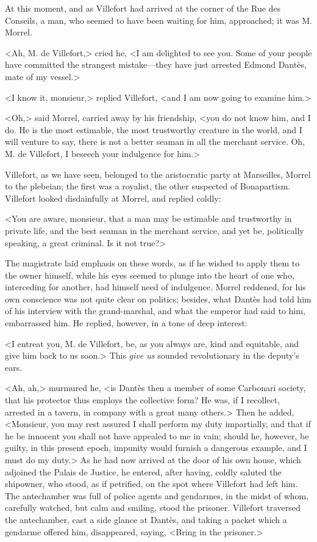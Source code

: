  At this moment, and as Villefort had arrived at the corner of the Rue des Conseils, a man, who seemed to have been waiting for him, approached; it was M. Morrel. 

 <Ah, M. de Villefort,> cried he, <I am delighted to see you. Some of your people have committed the strangest mistake—they have just arrested Edmond Dantès, mate of my vessel.> 

 <I know it, monsieur,> replied Villefort, <and I am now going to examine him.> 

 <Oh,> said Morrel, carried away by his friendship, <you do not know him, and I do. He is the most estimable, the most trustworthy creature in the world, and I will venture to say, there is not a better seaman in all the merchant service. Oh, M. de Villefort, I beseech your indulgence for him.> 

 Villefort, as we have seen, belonged to the aristocratic party at Marseilles, Morrel to the plebeian; the first was a royalist, the other suspected of Bonapartism. Villefort looked disdainfully at Morrel, and replied coldly: 

 <You are aware, monsieur, that a man may be estimable and trustworthy in private life, and the best seaman in the merchant service, and yet be, politically speaking, a great criminal. Is it not true?> 

 The magistrate laid emphasis on these words, as if he wished to apply them to the owner himself, while his eyes seemed to plunge into the heart of one who, interceding for another, had himself need of indulgence. Morrel reddened, for his own conscience was not quite clear on politics; besides, what Dantès had told him of his interview with the grand-marshal, and what the emperor had said to him, embarrassed him. He replied, however, in a tone of deep interest: 

 <I entreat you, M. de Villefort, be, as you always are, kind and equitable, and give him back to us soon.> This \textit{give us} sounded revolutionary in the deputy's ears. 

 <Ah, ah,> murmured he, <is Dantès then a member of some Carbonari society, that his protector thus employs the collective form? He was, if I recollect, arrested in a tavern, in company with a great many others.> Then he added, <Monsieur, you may rest assured I shall perform my duty impartially, and that if he be innocent you shall not have appealed to me in vain; should he, however, be guilty, in this present epoch, impunity would furnish a dangerous example, and I must do my duty.>  As he had now arrived at the door of his own house, which adjoined the Palais de Justice, he entered, after having, coldly saluted the shipowner, who stood, as if petrified, on the spot where Villefort had left him. The antechamber was full of police agents and gendarmes, in the midst of whom, carefully watched, but calm and smiling, stood the prisoner. Villefort traversed the antechamber, cast a side glance at Dantès, and taking a packet which a gendarme offered him, disappeared, saying, <Bring in the prisoner.> 

